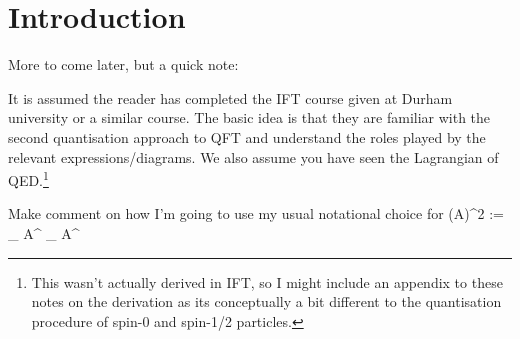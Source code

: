 \chapter{Introduction}

More to come later, but a quick note:

\begin{center}
    It is assumed the reader has completed the IFT course given at Durham university or a similar course. The basic idea is that they are familiar with the second quantisation approach to QFT and understand the roles played by the relevant expressions/diagrams. We also assume you have seen the Lagrangian of QED.\footnote{This wasn't actually derived in IFT, so I might include an appendix to these notes on the derivation as its conceptually a bit different to the quantisation procedure of spin-0 and spin-1/2 particles.}
\end{center}

Make comment on how I'm going to use my usual notational choice for 
\bse 
    (\p A)^2 := \p_{\mu} A^{\mu} \p_{\nu} A^{\nu} 
\ese 